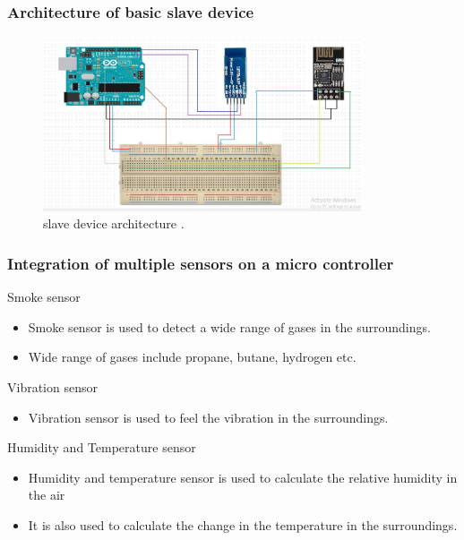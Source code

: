 \documentclass{beamer}
\begin{document}
\begin{frame}[shrink=10]\frametitle{Architecture of basic slave device }
\begin{itemize}
\begin{figure}[h]
\centerline{\includegraphics[width=3.7in]{slave}}
\caption{slave device architecture  .}
\end{figure}
\end{itemize}
\end{frame}
  \begin{frame}\frametitle{Integration of multiple sensors on a micro controller}
 \item Smoke  sensor
\begin{itemize}
\item Smoke sensor is used to detect a wide range of gases in the surroundings.
\item Wide range of gases include propane, butane, hydrogen etc.
\end{itemize}
 \item Vibration sensor
\begin{itemize}
    \item Vibration sensor is used to feel the vibration in the surroundings. 
    \end{itemize}
    \item Humidity and Temperature sensor
    \begin{itemize}
        \item Humidity and temperature sensor is used to calculate the relative humidity in the air
        \item It is also used to calculate the change in the temperature in the surroundings.
    \end{itemize}
\end{frame}
\end{document}
